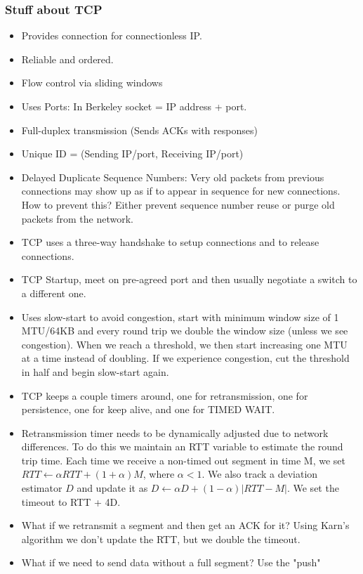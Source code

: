 \documentclass{scrartcl}
\begin{document}
\subsubsection*{Stuff about TCP}
\begin{itemize}
\item Provides connection for connectionless IP.
\item Reliable and ordered.
\item Flow control via sliding windows
\item Uses Ports: In Berkeley socket = IP address + port.
\item Full-duplex transmission (Sends ACKs with responses)
\item Unique ID = (Sending IP/port, Receiving IP/port)
\item Delayed Duplicate Sequence Numbers: Very old packets from previous
connections may show up as if to appear in sequence for new connections.
How to prevent this? Either prevent sequence number reuse or purge old
packets from the network.
\item TCP uses a three-way handshake to setup connections and to release
connections.
\item TCP Startup, meet on pre-agreed port and then usually negotiate a
switch to a different one.
\item Uses slow-start to avoid congestion, start with minimum window size
of 1 MTU/64KB and every round trip we double the window size (unless
we see congestion). When we reach a threshold, we then start increasing
one MTU at a time instead of doubling. If we experience congestion, cut
the threshold in half and begin slow-start again.
\item TCP keeps a couple timers around, one for retransmission, one for
persistence, one for keep alive, and one for TIMED WAIT.
\item Retransmission timer needs to be dynamically adjusted due to
network differences. To do this we maintain an RTT variable to estimate the
round trip time. Each time we receive a non-timed out segment in time M,
we set $RTT \leftarrow \alpha RTT + (1+\alpha)M$, where $\alpha < 1$.
We also track a deviation estimator $D$ and update it as $D \leftarrow
\alpha D + (1 - \alpha)|RTT - M|$. We set the timeout to RTT + 4D.
\item What if we retransmit a segment and then get an ACK for it? Using
Karn's algorithm we don't update the RTT, but we double the timeout.
\item What if we need to send data without a full segment? Use the "push"

\end{itemize}
\end{document}
